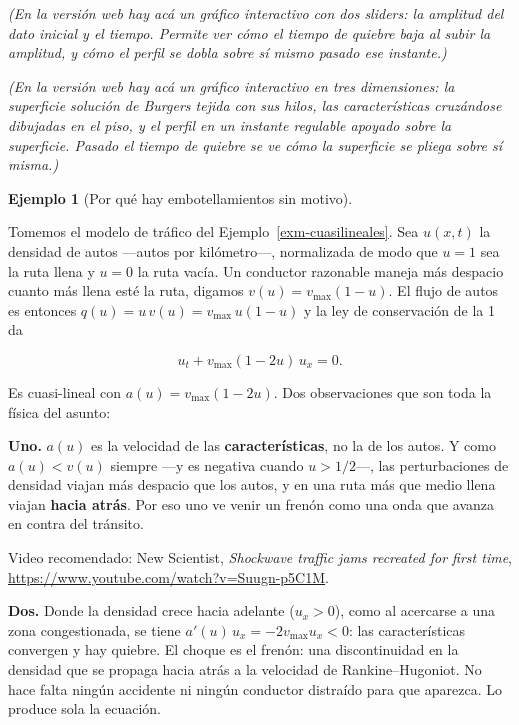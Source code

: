 \documentclass[
  spanish,
  a4paper,
]{scrbook}
\theoremstyle{definition}
\theoremstyle{plain}
\theoremstyle{definition}
\newtheorem{example}{Ejemplo}[chapter]
\theoremstyle{plain}
\theoremstyle{definition}
\theoremstyle{remark}
\begin{document}
\emph{(En la versión web hay acá un gráfico interactivo con dos sliders:
la amplitud del dato inicial y el tiempo. Permite ver cómo el tiempo de
quiebre baja al subir la amplitud, y cómo el perfil se dobla sobre sí
mismo pasado ese instante.)}

\emph{(En la versión web hay acá un gráfico interactivo en tres
dimensiones: la superficie solución de Burgers tejida con sus hilos, las
características cruzándose dibujadas en el piso, y el perfil en un
instante regulable apoyado sobre la superficie. Pasado el tiempo de
quiebre se ve cómo la superficie se pliega sobre sí misma.)}

\begin{example}[Por qué hay embotellamientos sin
motivo]\protect\hypertarget{exm-trafico}{}\label{exm-trafico}

Tomemos el modelo de tráfico del Ejemplo~\ref{exm-cuasilineales}. Sea
\(u(x,t)\) la densidad de autos ---autos por kilómetro---, normalizada
de modo que \(u=1\) sea la ruta llena y \(u=0\) la ruta vacía. Un
conductor razonable maneja más despacio cuanto más llena esté la ruta,
digamos \(v(u) = v_{\max}(1-u)\). El flujo de autos es entonces
\(q(u) = u\,v(u) = v_{\max}\,u(1-u)\) y la ley de conservación de la 1
da

\[
u_t + v_{\max}(1-2u)\,u_x = 0 .
\]

Es cuasi-lineal con \(a(u) = v_{\max}(1-2u)\). Dos observaciones que son
toda la física del asunto:

\textbf{Uno.} \(a(u)\) es la velocidad de las \textbf{características},
no la de los autos. Y como \(a(u) < v(u)\) siempre ---y es negativa
cuando \(u > 1/2\)---, las perturbaciones de densidad viajan más
despacio que los autos, y en una ruta más que medio llena viajan
\textbf{hacia atrás}. Por eso uno ve venir un frenón como una onda que
avanza en contra del tránsito.

Video recomendado: New Scientist, \emph{Shockwave traffic jams recreated
for first time}, \url{https://www.youtube.com/watch?v=Suugn-p5C1M}.

\textbf{Dos.} Donde la densidad crece hacia adelante (\(u_x > 0\)), como
al acercarse a una zona congestionada, se tiene
\(a'(u)\,u_x = -2v_{\max}u_x < 0\): las características convergen y hay
quiebre. El choque es el frenón: una discontinuidad en la densidad que
se propaga hacia atrás a la velocidad de Rankine--Hugoniot. No hace
falta ningún accidente ni ningún conductor distraído para que aparezca.
Lo produce sola la ecuación.

\end{example}
\end{document}
